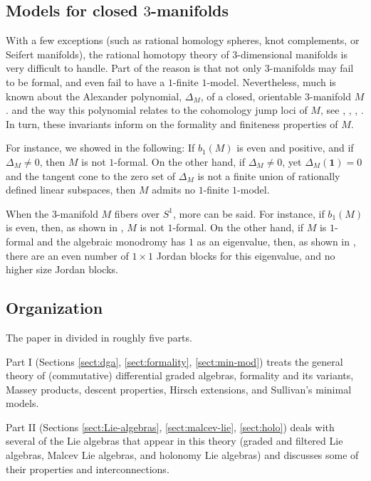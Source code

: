 \documentclass{article}
\numberwithin{equation}{section}
\theoremstyle{definition}
\newcommand{\one}{\mathbf{1}}
\begin{document}
\subsection{Models for closed $3$-manifolds}
\label{subsec:intro-algmod3}
With a few exceptions (such as rational homology spheres, knot complements, 
or Seifert manifolds), the rational homotopy theory of $3$-dimensional 
manifolds is very difficult to handle. Part of the reason is that not 
only $3$-manifolds may fail to be formal, and even fail to have a  
$1$-finite $1$-model. Nevertheless, much is known about the Alexander 
polynomial, $\Delta_M$, of a closed, orientable $3$-manifold $M$.
and the way this polynomial relates to the cohomology jump 
loci of $M$, see \cite{DPS-mz}, \cite{FS}, \cite{Su-edinb}, \cite{Su-mm}.  
In turn, these invariants inform on the formality 
and finiteness properties of $M$. 

For instance, we showed in \cite{Su-mm} the following: If 
$b_1(M)$ is even and positive, and if $\Delta_M\ne 0$, then 
$M$ is not $1$-formal. On the other hand, if $\Delta_M\ne 0$, yet 
$\Delta_M(\one) =0$  and the tangent cone to the zero set of $\Delta_M$ 
is not a finite union of rationally defined linear subspaces, then $M$ 
admits no $1$-finite $1$-model. 

When the $3$-manifold $M$ fibers over $S^1$, more can be said. For 
instance, if $b_1(M)$ is even, then, as shown in \cite{PS-plms10}, 
$M$ is not $1$-formal.  On the other hand, if $M$ is $1$-formal 
and the algebraic monodromy has $1$ as an eigenvalue, then, 
as shown in \cite{PS-forum}, there are an even number of 
$1\times 1$ Jordan blocks for this eigenvalue, 
and no higher size Jordan blocks. 

\subsection{Organization}
\label{subsec:intro-org}
The paper in divided in roughly five parts.

Part I (Sections \ref{sect:dga}, \ref{sect:formality}, \ref{sect:min-mod}) 
treats the general theory of (commutative) differential graded algebras, 
formality and its variants, Massey products, descent properties, Hirsch 
extensions, and Sullivan's minimal models.

Part II (Sections \ref{sect:Lie-algebras}, \ref{sect:malcev-lie}, \ref{sect:holo}) 
deals with several of the Lie algebras that appear in this theory (graded and 
filtered Lie algebras, Malcev Lie algebras, and holonomy Lie algebras) and 
discusses some of their properties and interconnections.
\end{document}
